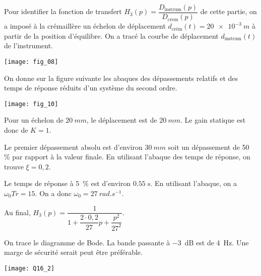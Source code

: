 \begin{multicols}{2}
Pour identifier la fonction de transfert $H_3(p)=\dfrac{D_{\text{instrum}}(p)}{D_{\text{crem}}(p)}$ de cette partie, on a imposé à la crémaillère un échelon de déplacement $d_{\text{crém}}(t) = \SI{20e-3}{m}$ à partir de la position d’équilibre. On a tracé la courbe de déplacement $d_{\text{instrum}}(t)$ de l’instrument.

\begin{center}
\texttt{[image: fig\_08]}
\end{center}

On donne sur la figure suivante les abaques des dépassements relatifs et des temps de réponse réduits d’un système du second ordre.

\begin{center}
\texttt{[image: fig\_10]}
\end{center}

\fi

\ifprof
\begin{corrige}
Pour un échelon de $\SI{20}{mm}$, le déplacement est de $\SI{20}{mm}$. Le gain statique est donc de $K=1$. 

Le premier dépassement absolu est d'environ $\SI{30}{mm}$ soit un dépassement de 50\, \% par rapport à la valeur finale. En utilisant l'abaque des temps de réponse, on trouve $\xi = 0,2$. 

Le temps de réponse à 5\, \% est d'environ $\SI{0,55}{s}$. En utilisant l'abaque, on a $\omega_0 Tr = 15$. On a donc $\omega_0=\SI{27}{rad.s^{-1}}$.

Au final, $H_3(p)=\dfrac{1}{1+\dfrac{2\cdot 0,2}{27}p+\dfrac{p^2}{27^2}}$.
\end{corrige}
\else
\fi


\ifprof
\begin{corrige}
On trace le diagramme de Bode. La bande passante à  \SI{-3}{dB} est de \SI{4}{Hz}. Une marge de sécurité serait peut être préférable.

\begin{center}
\texttt{[image: Q16\_2]}
\end{center}
\end{corrige}
\else
\fi




\end{multicols}
